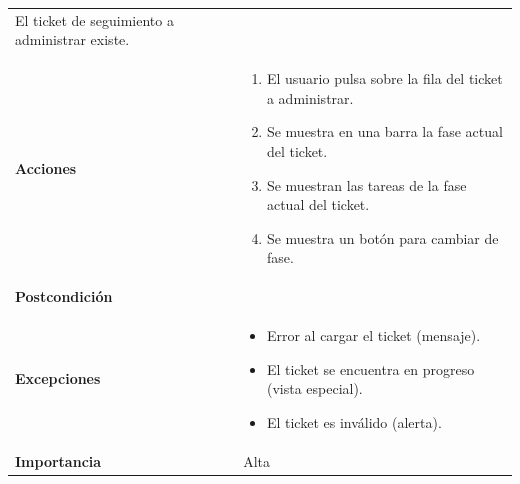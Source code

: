 \documentclass[
]{article}
\providecommand{\tightlist}{%
  \setlength{\itemsep}{0pt}\setlength{\parskip}{0pt}}
\begin{document}
\begin{longtable}[]{@{}ll@{}}
\begin{minipage}[t]{0.68\columnwidth}
El ticket de seguimiento a administrar existe.\strut
\end{minipage}\tabularnewline
\begin{minipage}[t]{0.26\columnwidth}\raggedright
\textbf{Acciones}\strut
\end{minipage} & \begin{minipage}[t]{0.68\columnwidth}\raggedright
\begin{enumerate}
\def\labelenumi{\arabic{enumi}.}
\tightlist
\item
  El usuario pulsa sobre la fila del ticket a administrar.
\item
  Se muestra en una barra la fase actual del ticket.
\item
  Se muestran las tareas de la fase actual del ticket.
\item
  Se muestra un botón para cambiar de fase.
\end{enumerate}\strut
\end{minipage}\tabularnewline
\begin{minipage}[t]{0.26\columnwidth}\raggedright
\textbf{Postcondición}\strut
\end{minipage} & \begin{minipage}[t]{0.68\columnwidth}\raggedright
\strut
\end{minipage}\tabularnewline
\begin{minipage}[t]{0.26\columnwidth}\raggedright
\textbf{Excepciones}\strut
\end{minipage} & \begin{minipage}[t]{0.68\columnwidth}\raggedright
\begin{itemize}
\tightlist
\item
  Error al cargar el ticket (mensaje).
\item
  El ticket se encuentra en progreso (vista especial).
\item
  El ticket es inválido (alerta).
\end{itemize}\strut
\end{minipage}\tabularnewline
\begin{minipage}[t]{0.26\columnwidth}\raggedright
\textbf{Importancia}\strut
\end{minipage} & \begin{minipage}[t]{0.68\columnwidth}\raggedright
Alta\strut
\end{minipage}\tabularnewline
\bottomrule
\end{longtable}
\end{document}
